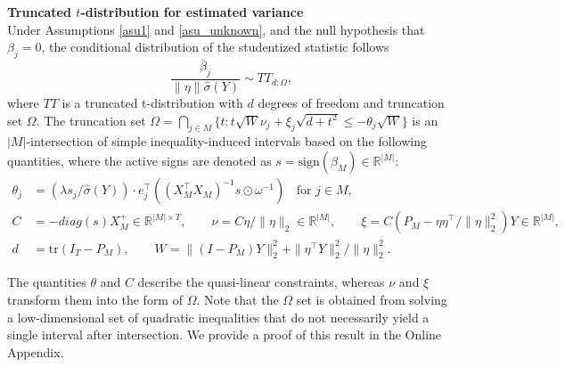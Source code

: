 \documentclass[11pt]{article}
\newcommand{\sgn}{\textrm{sign}}
\newcommand{\RR}{\mathbb{R}}
\newcommand{\tr}{\mathrm{tr}}
\begin{document}
\begin{theorem_app}{\bf Truncated $t$-distribution for estimated variance}\label{thm:appendix} \\
	Under Assumptions \ref{asu1} and \ref{asu_unknown}, and the null hypothesis that $\beta_j=0$, the conditional distribution of the studentized statistic follows
	\begin{equation}
			\frac{\bar{\beta}_j}{\|\eta\|\hat{\sigma}(Y)}\sim TT_{d;\Omega},
	\end{equation}
	where $TT$ is a truncated t-distribution with $d$ degrees of freedom and truncation set $\Omega$. The truncation set $\Omega=\bigcap_{j\in M}\{t:t\sqrt{W}\nu_j+\xi_j\sqrt{d+t^2}\leq -\theta_j\sqrt{W}\}$ is an $|M|$-intersection of simple inequality-induced intervals based on the following quantities, where the active signs are denoted as $s=\sgn(\hat{\beta}_M)\in\RR^{|M|}$: 
	\begin{align*}
		\theta_j &=
		(\lambda s_j/\hat{\sigma}(Y) )\cdot  e_j^\top \left((X_M^\top X_M)^{-1}s\odot \omega^{-1}\right) \;\; \text{ for }j\in M,\\
		C&=-diag(s) X_M^+\in\RR^{|M|\times T}, \qquad \nu=C\eta/\|\eta\|_2\in\RR^{|M|}, \qquad \xi=C (P_M-\eta\eta^\top /\|\eta\|_2^2 )Y\in\RR^{|M|}, \\
		d&=\tr(I_T-P_M), \qquad W=\|(I-P_M)Y\|_2^2+\|\eta^\top Y\|_2^2/\|\eta\|_2^2.
	\end{align*}

\end{theorem_app}



The quantities $\theta$ and $C$ describe the quasi-linear constraints, whereas $\nu$ and $\xi$ transform them into the form of $\Omega$. Note that the $\Omega$ set is obtained from solving a low-dimensional set of quadratic inequalities that do not necessarily yield a single interval after intersection. We provide a proof of this result in the Online Appendix.
\end{document}
